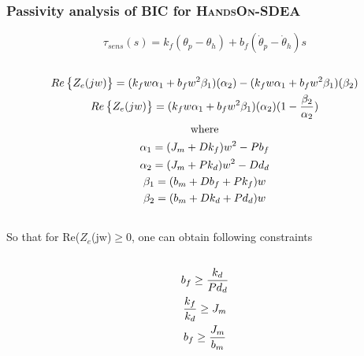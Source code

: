 \documentclass[a4paper,12pt]{article}
\begin{document}
\subsubsection{Passivity analysis of BIC for \textsc{HandsOn-SDEA}}
\begin{equation}
\tau_{sens}(s)=k_f(\theta_p-\theta_h)+b_f(\dot\theta_p-\dot\theta_h)s
\end{equation}
\begin{equation}
\begin{multlined}\\
Re\begin{Bmatrix}Z_e(jw)\end{Bmatrix}=(k_fw\alpha_1 +b_fw^2\beta_1)(\alpha_2) -(k_fw\alpha_1 +b_fw^2\beta_1)(\beta_2)\\
Re\begin{Bmatrix}Z_e(jw)\end{Bmatrix}=(k_fw\alpha_1 +b_fw^2\beta_1)(\alpha_2)(1-\frac{\beta_2}{\alpha_2})\\
\mathrm{where}\\
\alpha_1=(J_m+Dk_f)w^2-Pb_f\\
\alpha_2=(J_m+Pk_d)w^2-Dd_d\\
\beta_1=(b_m+Db_f+Pk_f)w \\
\beta_2=(b_m+Dk_d+Pd_d)w \\
\end{multlined}\\
\end{equation}
So that for Re($Z_e$(jw)$\geq$0, one can obtain following constraints
\begin{equation}
\begin{multlined}\\
b_f\geq \frac{k_d}{Pd_d}\\
\frac{k_f}{k_d}\geq J_m\\
b_f\geq\frac{J_m}{b_m} \\
\end{multlined}\\
\end{equation}
\end{document}
